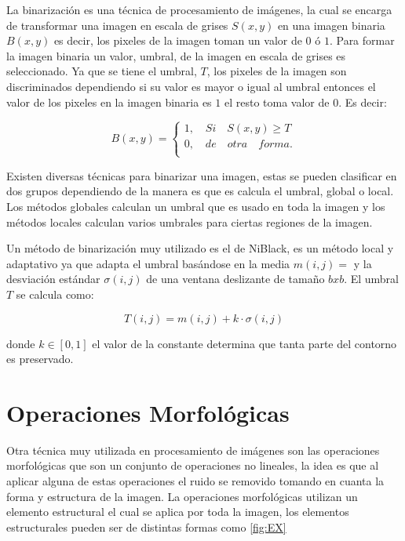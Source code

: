 La binarización es una técnica de procesamiento de imágenes, la cual se encarga de transformar una imagen en escala de grises $S(x,y)$ en una imagen binaria $B(x,y)$ es decir, los pixeles de la imagen toman un valor de $0$ ó $1$.   
Para formar la imagen binaria un valor, umbral, de la imagen en escala de grises es seleccionado. Ya que se tiene el umbral, $T$,     
los pixeles de la imagen son discriminados dependiendo si su valor es mayor o igual al umbral entonces el valor de los pixeles en la imagen binaria es $1$ el resto toma valor de $0$. Es decir: 

$$B(x,y)=
\begin{cases}   
1, \quad Si \quad  S(x,y)\geq T \\
0, \quad de \quad otra \quad forma.\\
\end{cases}$$

Existen diversas técnicas para binarizar una imagen, estas se pueden clasificar en dos grupos dependiendo de la manera es que es calcula el umbral, global o local. Los métodos globales calculan un umbral que es usado en toda la imagen y los métodos locales calculan varios umbrales para ciertas regiones de la imagen.  

Un método de binarización muy utilizado es el de NiBlack, \citep{Chaki2014} es un método local y adaptativo ya que adapta el umbral basándose en la media $m(i,j)=$ y la desviación estándar $\sigma(i,j)$ de una ventana deslizante de tamaño $bxb$. El umbral $T$  se calcula como: 

$$T(i,j)=m(i,j)+k \cdot \sigma(i,j)$$ 

donde $k \in [0,1]$ el valor de la constante determina que tanta parte del contorno es preservado.


  
\section{Operaciones Morfológicas}\label{OperacionesMorfologicas} 

Otra técnica muy utilizada en procesamiento de imágenes son las operaciones morfológicas que son un conjunto de operaciones no lineales, la idea es que al aplicar alguna de estas operaciones el ruido se removido tomando en cuanta la forma y estructura de la imagen. 
La operaciones morfológicas utilizan un elemento estructural el cual se aplica por toda la imagen, los elementos estructurales pueden ser de distintas formas como \ref{fig:EX}

